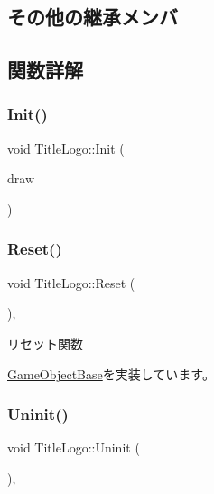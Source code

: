 \subsection*{その他の継承メンバ}


\subsection{関数詳解}
\mbox{\label{class_title_logo_a1e07aae4771bd7a44cb7e3b55b72b9f3}} 
\subsubsection{\texorpdfstring{Init()}{Init()}}
{\footnotesize\ttfamily void Title\+Logo\+::\+Init (\begin{DoxyParamCaption}\item[{\mbox{\hyperlink{class_draw_base}{Draw\+Base}} $\ast$}]{draw }\end{DoxyParamCaption})}

\mbox{\label{class_title_logo_a8bca39d06592b95b26024c2d86ac349c}} 
\subsubsection{\texorpdfstring{Reset()}{Reset()}}
{\footnotesize\ttfamily void Title\+Logo\+::\+Reset (\begin{DoxyParamCaption}{ }\end{DoxyParamCaption})\hspace{0.3cm}{\ttfamily [override]}, {\ttfamily [virtual]}}



リセット関数 



\mbox{\hyperlink{class_game_object_base_a85c59554f734bcb09f1a1e18d9517dce}{Game\+Object\+Base}}を実装しています。

\mbox{\label{class_title_logo_a177943b3becc80fcdb7a34f131b07ee9}} 
\subsubsection{\texorpdfstring{Uninit()}{Uninit()}}
{\footnotesize\ttfamily void Title\+Logo\+::\+Uninit (\begin{DoxyParamCaption}{ }\end{DoxyParamCaption})\hspace{0.3cm}{\ttfamily [override]}, {\ttfamily [virtual]}}




